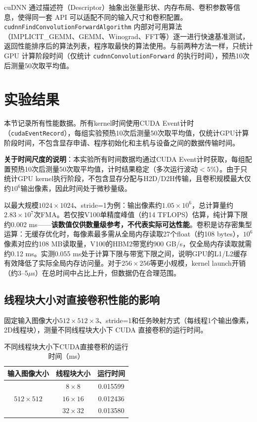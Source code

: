 \documentclass{SYSUReport}
\begin{document}
cuDNN 通过描述符（Descriptor）抽象出张量形状、内存布局、卷积参数等信息，使得同一套 API 可以适配不同的输入尺寸和卷积配置。\texttt{cudnnFindConvolutionForwardAlgorithm} 内部对可用算法（IMPLICIT\_GEMM、GEMM、Winograd、FFT等）逐一进行快速基准测试，返回性能排序后的算法列表，程序取最快的算法使用。与前两种方法一样，只统计 GPU 计算阶段时间（仅统计 \texttt{cudnnConvolutionForward} 的执行时间），预热10次后测量50次取平均值。

\section{实验结果}
本节记录所有性能数据。所有kernel时间使用CUDA Event计时（\texttt{cudaEventRecord}），每组实验预热10次后测量50次取平均值，仅统计GPU计算阶段时间，不包含显存申请、程序初始化和主机与设备之间的数据传输时间。

\textbf{关于时间尺度的说明}：本实验所有时间数据均通过CUDA Event计时获取，每组配置预热10次后测量50次取平均值，计时结果稳定（多次运行波动$<5\%$）。由于只统计GPU kernel执行阶段，不包含显存分配与H2D/D2H传输，且卷积规模最大仅约$10^6$输出像素，因此时间处于微秒量级。

以最大规模$1024\times1024$、stride=1为例：输出像素约$1.05\times10^6$，总计算量约$2.83\times10^7$次FMA。若仅按V100单精度峰值（约14 TFLOPS）估算，纯计算下限约0.002 ms——\textbf{该数值仅供数量级参考，不代表实际可达性能}。卷积是访存密集型运算：无缓存优化时，每像素最多需从全局内存读取27个float（约108 bytes），$10^6$像素对应约108 MB读取量，V100的HBM2带宽约900 GB/s，仅全局内存读取就需约0.12 ms。实测0.055 ms处于计算下限与带宽下限之间，说明GPU的L1/L2缓存有效降低了实际全局内存访问量。对于$256\times256$等更小规模，kernel launch开销（约3--5$\mu$s）在总时间中占比上升，但数据仍在合理范围。

\subsection{线程块大小对直接卷积性能的影响}
固定输入图像大小$512\times512\times3$、stride=1和任务映射方式（每线程1个输出像素，2D线程块），测量不同线程块大小下 CUDA 直接卷积的运行时间。

\begin{table}[H]
\centering
\caption{不同线程块大小下CUDA直接卷积的运行时间（ms）}
\label{tab:block_size}
\begin{tabular}{|c|c|c|}
\hline
输入图像大小 & 线程块大小 & 运行时间 \\
\hline
\multirow{3}{*}{$512\times512$}
& $8\times8$   & 0.015599 \\
\cline{2-3}
& $16\times16$ & 0.012436 \\
\cline{2-3}
& $32\times32$ & 0.013580 \\
\hline
\end{tabular}
\end{table}
\end{document}
